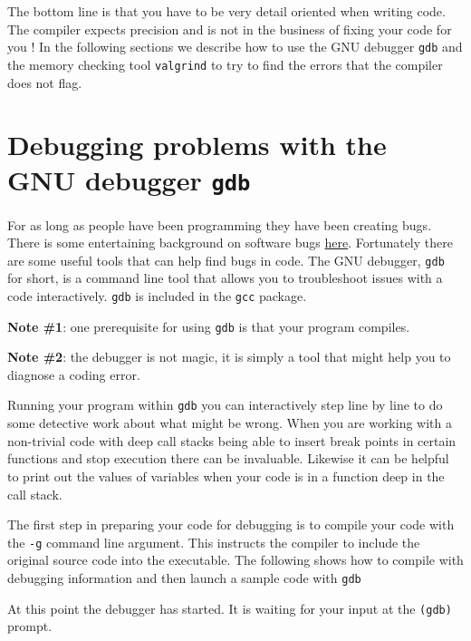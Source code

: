 The bottom line is that you have to be very detail oriented when writing code. The compiler expects precision and is not in the business of fixing your code for you ! In the following sections we describe how to use the GNU debugger \texttt{gdb} and the memory checking tool \texttt{valgrind} to try to find the errors that the compiler does not flag.

\section{Debugging problems with the GNU debugger \texttt{gdb}}


For as long as people have been programming they have been creating bugs. There is some entertaining background on software bugs \href{https://en.wikipedia.org/wiki/Software_bug}{here}. Fortunately there are some useful tools that can help find bugs in code. The GNU debugger, \texttt{gdb} for short, is a command line tool that allows you to troubleshoot issues with a code interactively. \texttt{gdb} is included in the \texttt{gcc} package. 

{\bf Note \#1}: one prerequisite for using \texttt{gdb} is that your program compiles.

{\bf Note \#2}: the debugger is not magic, it is simply a tool that might help you to diagnose a coding error.

Running your program within \texttt{gdb}  you can interactively step line by line to do some detective work about what might be wrong. When you are working with a non-trivial code with deep call stacks being able to insert break points in certain functions and stop execution there can be invaluable. Likewise it can be helpful to  print out the values of variables when your code is in a function deep in the call stack.

The first step in preparing your code for debugging is to compile your code with the \texttt{-g} command line argument. This instructs the compiler to include the original source code into the executable. The following shows how to compile with debugging information and then launch a sample code with \texttt{gdb}

At this point the debugger has started. It is waiting for your input at the \texttt{(gdb)} prompt.

